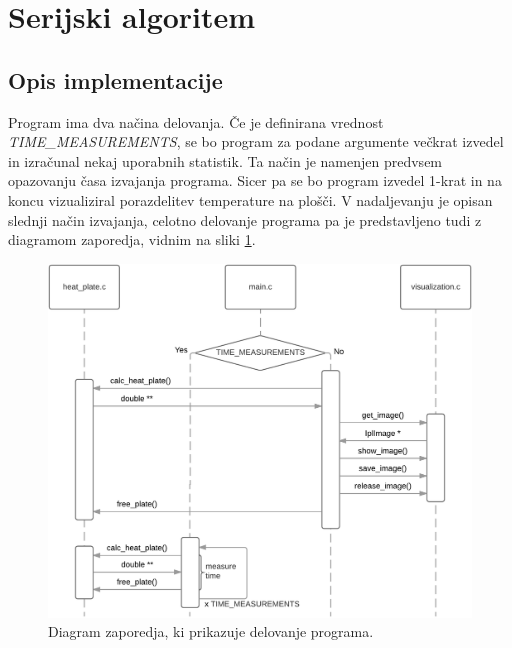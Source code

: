 \documentclass[a4paper,titlepage,11pt]{article}
\begin{document}
\pagebreak

\section{Serijski algoritem}

\subsection{Opis implementacije}

Program ima dva načina delovanja. Če je definirana vrednost \textit{TIME\_MEASUREMENTS}, se bo program za podane argumente večkrat izvedel in izračunal nekaj uporabnih statistik. Ta način je namenjen predvsem opazovanju časa izvajanja programa. Sicer pa se bo program izvedel 1-krat in na koncu vizualiziral porazdelitev temperature na plošči. V nadaljevanju je opisan slednji način izvajanja, celotno delovanje programa pa je predstavljeno tudi z diagramom zaporedja, vidnim na sliki \ref{slika-diagram-zaporedja}.

\begin{figure}[H]
\begin{center}
\includegraphics[scale=0.8]{diagram-zaporedja.png}
\caption{Diagram zaporedja, ki prikazuje delovanje programa.}
\label{slika-diagram-zaporedja}
\end{center}
\vspace{-25pt}
\end{figure}
\end{document}
